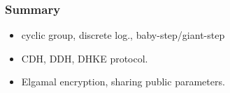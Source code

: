 \begin{frame}\frametitle{Summary}
\begin{itemize}
\item cyclic group, discrete log., baby-step/giant-step
\item CDH, DDH, DHKE protocol.
\item Elgamal encryption, sharing public parameters.
\end{itemize}
\end{frame}

